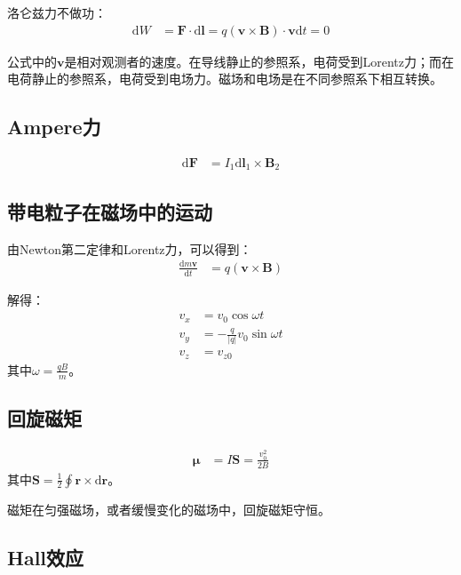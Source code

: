 \documentclass[12pt,onecolumn,a4paper]{book}
\numberwithin{table}{subsection}
\numberwithin{equation}{subsection}
\begin{document}
洛仑兹力不做功：
\begin{align}
    \mathrm{d} W & = \mathbf{F} \cdot \mathrm{d} \mathbf{l} = q( \mathbf{v} \times \mathbf{B}) \cdot \mathbf{v} \mathrm{d} t =0
\end{align}

公式中的$\mathbf{v}$是相对观测者的速度。在导线静止的参照系，电荷受到Lorentz力；而在电荷静止的参照系，电荷受到电场力。磁场和电场是在不同参照系下相互转换。

\subsection{Ampere力}

\begin{align}
    \mathrm{d} \mathbf{F} & = I_1 \mathrm{d} \mathbf{l}_1 \times \mathbf{B}_2
\end{align}

\subsection{带电粒子在磁场中的运动}

由Newton第二定律和Lorentz力，可以得到：
\begin{align}
    \frac{\mathrm{d} m\mathbf{v}}{\mathrm{d} t} & = q(\mathbf{v} \times \mathbf{B})
\end{align}

解得：
\begin{align}
    v_x & = v_{0} \cos \omega t                \\
    v_y & = - \frac{q}{|q|}v_{0} \sin \omega t \\
    v_z & = v_{z0}
\end{align}
其中$\omega = \frac{qB}{m}$。

\subsection{回旋磁矩}

\begin{align}
    \mathbf{\mu} & = I \mathbf{S} = \frac{v_0^2}{2B}
\end{align}
其中$\mathbf{S}=\frac{1}{2}\oint \mathbf{r} \times \mathrm{d} \mathbf{r}$。

磁矩在匀强磁场，或者缓慢变化的磁场中，回旋磁矩守恒。

\subsection{Hall效应}
\end{document}
